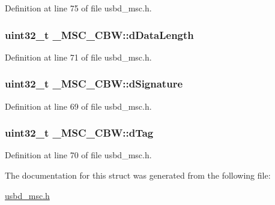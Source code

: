 Definition at line 75 of file usbd\+\_\+msc.\+h.

\subsubsection[{\texorpdfstring{d\+Data\+Length}{dDataLength}}]{\setlength{\rightskip}{0pt plus 5cm}uint32\+\_\+t \+\_\+\+M\+S\+C\+\_\+\+C\+B\+W\+::d\+Data\+Length}\hypertarget{struct__MSC__CBW_af35538f5f1b08d48b3f11f5cb3c858ca}{}\label{struct__MSC__CBW_af35538f5f1b08d48b3f11f5cb3c858ca}


Definition at line 71 of file usbd\+\_\+msc.\+h.

\subsubsection[{\texorpdfstring{d\+Signature}{dSignature}}]{\setlength{\rightskip}{0pt plus 5cm}uint32\+\_\+t \+\_\+\+M\+S\+C\+\_\+\+C\+B\+W\+::d\+Signature}\hypertarget{struct__MSC__CBW_a1fa625c9bfe68afb30fe973585627c38}{}\label{struct__MSC__CBW_a1fa625c9bfe68afb30fe973585627c38}


Definition at line 69 of file usbd\+\_\+msc.\+h.

\subsubsection[{\texorpdfstring{d\+Tag}{dTag}}]{\setlength{\rightskip}{0pt plus 5cm}uint32\+\_\+t \+\_\+\+M\+S\+C\+\_\+\+C\+B\+W\+::d\+Tag}\hypertarget{struct__MSC__CBW_a2bc3d8d87456e730b569f155a013fbda}{}\label{struct__MSC__CBW_a2bc3d8d87456e730b569f155a013fbda}


Definition at line 70 of file usbd\+\_\+msc.\+h.



The documentation for this struct was generated from the following file\+:\begin{DoxyCompactItemize}
\item 
\hyperlink{usbd__msc_8h}{usbd\+\_\+msc.\+h}\end{DoxyCompactItemize}

